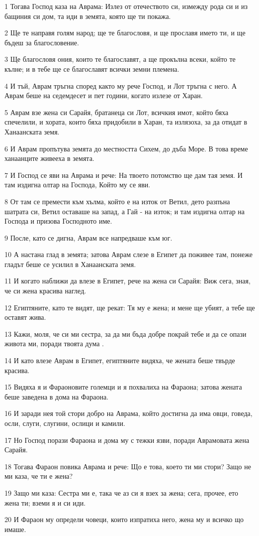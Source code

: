 \par 1 Тогава Господ каза на Аврама: Излез от отечеството си, измежду рода си и из бащиния си дом, та иди в земята, която ще ти покажа.
\par 2 Ще те направя голям народ; ще те благословя, и ще прославя името ти, и ще бъдеш за благословение.
\par 3 Ще благословя ония, които те благославят, а ще прокълна всеки, който те кълне; и в тебе ще се благославят всички земни племена.
\par 4 И тъй, Аврам тръгна според както му рече Господ, и Лот тръгна с него. А Аврам беше на седемдесет и пет години, когато излезе от Харан.
\par 5 Аврам взе жена си Сарайя, братанеца си Лот, всичкия имот, който бяха спечелили, и хората, които бяха придобили в Харан, та излязоха, за да отидат в Ханаанската земя.
\par 6 И Аврам пропътува земята до местността Сихем, до дъба Море. В това време ханаанците живееха в земята.
\par 7 И Господ се яви на Аврама и рече: На твоето потомство ще дам тая земя. И там издигна олтар на Господа, Който му се яви.
\par 8 От там се премести към хълма, който е на изток от Ветил, дето разпъна шатрата си, Ветил оставаше на запад, а Гай - на изток; и там издигна олтар на Господа и призова Господното име.
\par 9 После, като се дигна, Аврам все напредваше към юг.
\par 10 А настана глад в земята; затова Аврам слезе в Египет да поживее там, понеже гладът беше се усилил в Ханаанската земя.
\par 11 И когато наближи да влезе в Египет, рече на жена си Сарайя: Виж сега, зная, че си жена красива наглед.
\par 12 Египтяните, като те видят, ще рекат: Тя му е жена; и мене ще убият, а тебе ще оставят жива.
\par 13 Кажи, моля, че си ми сестра, за да ми бъда добре покрай тебе и да се опази живота ми, поради твоята дума .
\par 14 И като влезе Аврам в Египет, египтяните видяха, че жената беше твърде красива.
\par 15 Видяха я и Фараоновите големци и я похвалиха на Фараона; затова жената беше заведена в дома на Фараона.
\par 16 И заради нея той стори добро на Аврама, който достигна да има овци, говеда, осли, слуги, слугини, ослици и камили.
\par 17 Но Господ порази Фараона и дома му с тежки язви, поради Аврамовата жена Сарайя.
\par 18 Тогава Фараон повика Аврама и рече: Що е това, което ти ми стори? Защо не ми каза, че ти е жена?
\par 19 Защо ми каза: Сестра ми е, така че аз си я взех за жена; сега, прочее, ето жена ти; вземи я и си иди.
\par 20 И Фараон му определи човеци, които изпратиха него, жена му и всичко що имаше.

